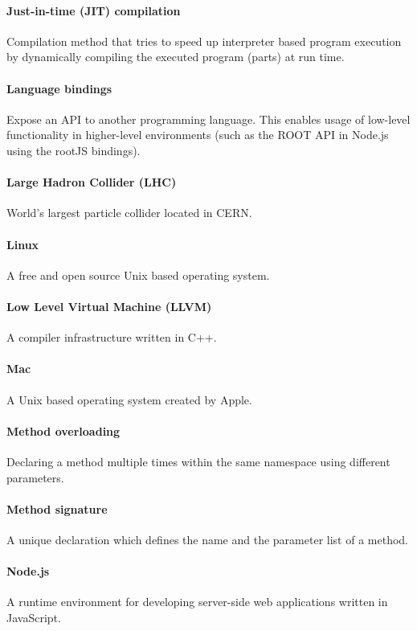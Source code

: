 \paragraph{Just-in-time (JIT) compilation}
Compilation method that tries to speed up interpreter based program execution by dynamically compiling the executed program (parts) at run time.

\paragraph{Language bindings}
Expose an API to another programming language. This enables usage of low-level functionality in higher-level environments (such as the ROOT API in Node.js using the rootJS bindings).

\paragraph{Large Hadron Collider (LHC)}
World's largest particle collider located in CERN.

\paragraph{Linux}
A free and open source Unix based operating system.

\paragraph{Low Level Virtual Machine (LLVM)}
A compiler infrastructure written in C++.

\paragraph{Mac}
A Unix based operating system created by Apple.

\paragraph{Method overloading}
Declaring a method multiple times within the same namespace using different parameters.

\paragraph{Method signature}
A unique declaration which defines the name and the parameter list of a method.

\paragraph{Node.js}
A runtime environment for developing server-side web applications written in JavaScript.

